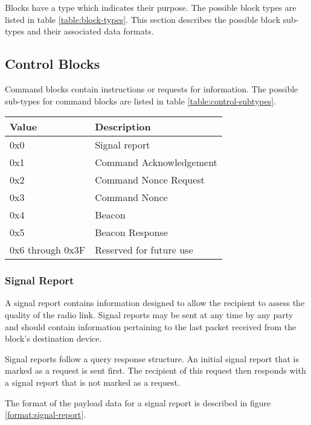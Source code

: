 Blocks have a type which indicates their purpose. The possible block types are listed in table \ref{table:block-types}.
This section describes the possible block sub-types and their associated data formats.

\subsection{Control Blocks}
Command blocks contain instructions or requests for information. The possible sub-types for command blocks are listed
in table \ref{table:control-subtypes}.

\begin{table*}[htb]
    \centering
    \begin{tabular}{@{}ll@{}}
        \toprule
        Value            & Description             \\
        \midrule
        0x0              & Signal report           \\
        0x1              & Command Acknowledgement \\
        0x2              & Command Nonce Request   \\
        0x3              & Command Nonce           \\
        0x4              & Beacon                  \\
        0x5              & Beacon Response         \\
        0x6 through 0x3F & Reserved for future use \\
        \bottomrule
    \end{tabular}
    \caption{Control Block Subtypes}
    \label{table:control-subtypes}
\end{table*}

\subsubsection{Signal Report}
A signal report contains information designed to allow the recipient to assess the quality of the radio link. Signal
reports may be sent at any time by any party and should contain information pertaining to the last packet received from
the block's destination device.

Signal reports follow a query response structure. An initial signal report that is marked as a request is sent first.
The recipient of this request then responds with a signal report that is not marked as a request.

The format of the payload data for a signal report is described in figure \ref{format:signal-report}.

